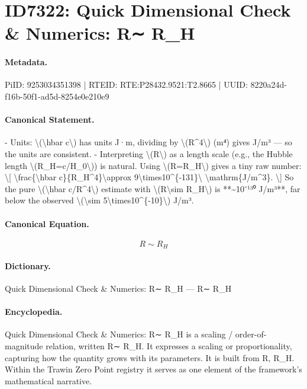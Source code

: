 \section*{ID7322: Quick Dimensional Check \& Numerics: R∼ R\_H}
\paragraph{Metadata.}
PiID: 9253034351398 | RTEID: RTE:P28432.9521:T2.8665 | UUID: 8220a24d-f16b-50f1-ad5d-8254e0e210e9

\paragraph{Canonical Statement.}
- Units: \textbackslash{}(\textbackslash{}hbar c\textbackslash{}) has units J·m, dividing by \textbackslash{}(R\textasciicircum{}4\textbackslash{}) (m⁴) gives J/m³ — so the units are consistent. - Interpreting \textbackslash{}(R\textbackslash{}) as a length scale (e.g., the Hubble length \textbackslash{}(R\_H=c/H\_0\textbackslash{})) is natural. Using \textbackslash{}(R=R\_H\textbackslash{}) gives a tiny raw number: \textbackslash{}[ \textbackslash{}frac\{\textbackslash{}hbar c\}\{R\_H\textasciicircum{}4\}\textbackslash{}approx 9\textbackslash{}times10\textasciicircum{}\{-131\}\textbackslash{} \textbackslash{}mathrm\{J/m\textasciicircum{}3\}. \textbackslash{}] So the pure \textbackslash{}(\textbackslash{}hbar c/R\textasciicircum{}4\textbackslash{}) estimate with \textbackslash{}(R\textbackslash{}sim R\_H\textbackslash{}) is **\textasciitilde{}10⁻¹³⁰ J/m³**, far below the observed \textbackslash{}(\textbackslash{}sim 5\textbackslash{}times10\textasciicircum{}\{-10\}\textbackslash{}) J/m³.

\paragraph{Canonical Equation.}
\[
R\sim R_H
\]

\paragraph{Dictionary.}
Quick Dimensional Check \& Numerics: R∼ R\_H — R∼ R\_H

\paragraph{Encyclopedia.}
Quick Dimensional Check \& Numerics: R∼ R\_H is a scaling / order-of-magnitude relation, written R∼ R\_H. It expresses a scaling or proportionality, capturing how the quantity grows with its parameters. It is built from R, R\_H. Within the Trawin Zero Point registry it serves as one element of the framework's mathematical narrative.
